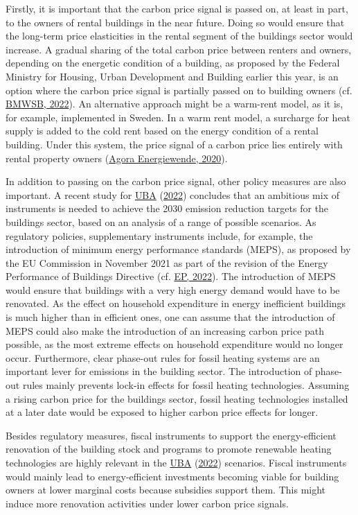 \documentclass[12pt,twoside]{reedthesis}
\begin{document}
Firstly, it is important that the carbon price signal is passed on, at least in part, to the owners of rental buildings in the near future. Doing so would ensure that the long-term price elasticities in the rental segment of the buildings sector would increase. A gradual sharing of the total carbon price between renters and owners, depending on the energetic condition of a building, as proposed by the Federal Ministry for Housing, Urban Development and Building earlier this year, is an option where the carbon price signal is partially passed on to building owners (cf. \protect\hyperlink{ref-bmwsb22}{BMWSB, 2022}). An alternative approach might be a warm-rent model, as it is, for example, implemented in Sweden. In a warm rent model, a surcharge for heat supply is added to the cold rent based on the energy condition of a rental building. Under this system, the price signal of a carbon price lies entirely with rental property owners (\protect\hyperlink{ref-agoraenergiewende20}{Agora Energiewende, 2020}).

In addition to passing on the carbon price signal, other policy measures are also important. A recent study for \protect\hyperlink{ref-uba22}{UBA} (\protect\hyperlink{ref-uba22}{2022}) concludes that an ambitious mix of instruments is needed to achieve the 2030 emission reduction targets for the buildings sector, based on an analysis of a range of possible scenarios. As regulatory policies, supplementary instruments include, for example, the introduction of minimum energy performance standards (MEPS), as proposed by the EU Commission in November 2021 as part of the revision of the Energy Performance of Buildings Directive (cf. \protect\hyperlink{ref-ep22}{EP, 2022}). The introduction of MEPS would ensure that buildings with a very high energy demand would have to be renovated. As the effect on household expenditure in energy inefficient buildings is much higher than in efficient ones, one can assume that the introduction of MEPS could also make the introduction of an increasing carbon price path possible, as the most extreme effects on household expenditure would no longer occur. Furthermore, clear phase-out rules for fossil heating systems are an important lever for emissions in the building sector. The introduction of phase-out rules mainly prevents lock-in effects for fossil heating technologies. Assuming a rising carbon price for the buildings sector, fossil heating technologies installed at a later date would be exposed to higher carbon price effects for longer.

Besides regulatory measures, fiscal instruments to support the energy-efficient renovation of the building stock and programs to promote renewable heating technologies are highly relevant in the \protect\hyperlink{ref-uba22}{UBA} (\protect\hyperlink{ref-uba22}{2022}) scenarios. Fiscal instruments would mainly lead to energy-efficient investments becoming viable for building owners at lower marginal costs because subsidies support them. This might induce more renovation activities under lower carbon price signals.
\end{document}
